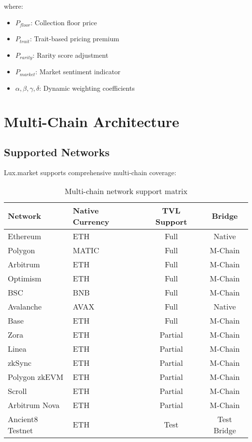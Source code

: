 \documentclass[11pt,a4paper]{article}
\begin{document}
where:
\begin{itemize}
\item $P_{floor}$: Collection floor price
\item $P_{trait}$: Trait-based pricing premium
\item $P_{rarity}$: Rarity score adjustment
\item $P_{market}$: Market sentiment indicator
\item $\alpha, \beta, \gamma, \delta$: Dynamic weighting coefficients
\end{itemize}

\section{Multi-Chain Architecture}

\subsection{Supported Networks}

Lux.market supports comprehensive multi-chain coverage:

\begin{table}[h]
\centering
\begin{tabular}{|l|l|c|c|}
\hline
\textbf{Network} & \textbf{Native Currency} & \textbf{TVL Support} & \textbf{Bridge} \\
\hline
Ethereum & ETH & Full & Native \\
Polygon & MATIC & Full & M-Chain \\
Arbitrum & ETH & Full & M-Chain \\
Optimism & ETH & Full & M-Chain \\
BSC & BNB & Full & M-Chain \\
Avalanche & AVAX & Full & Native \\
Base & ETH & Full & M-Chain \\
Zora & ETH & Partial & M-Chain \\
Linea & ETH & Partial & M-Chain \\
zkSync & ETH & Partial & M-Chain \\
Polygon zkEVM & ETH & Partial & M-Chain \\
Scroll & ETH & Partial & M-Chain \\
Arbitrum Nova & ETH & Partial & M-Chain \\
Ancient8 Testnet & ETH & Test & Test Bridge \\
\hline
\end{tabular}
\caption{Multi-chain network support matrix}
\end{table}
\end{document}
